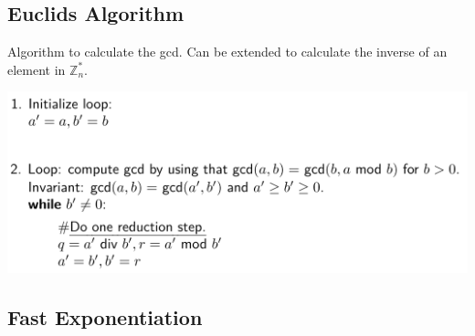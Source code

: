 \hypertarget{euclids-algorithm}{%
\subsection{Euclids Algorithm}\label{euclids-algorithm}}

\begin{minipage}{.3\linewidth}
Algorithm to calculate the gcd. Can be extended to calculate the inverse of an element in $\mathbb{Z}_n^*$.
\end{minipage}\hfill
\begin{minipage}{.65\linewidth}
    \includegraphics[width=\linewidth]{img/euclid}
\end{minipage}

\hypertarget{fast-exponentiation}{%
\subsection{Fast Exponentiation}\label{fast-exponentiation}}

